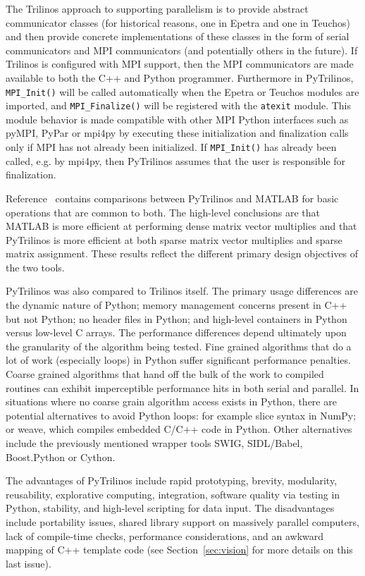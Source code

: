 \documentclass[11pt]{article}
\begin{document}
The Trilinos approach to supporting parallelism is to provide abstract communicator classes (for historical reasons, one in Epetra and one in Teuchos) and then provide concrete implementations of these classes in the form of serial communicators and MPI communicators (and potentially others in the future).  If Trilinos is configured with MPI support, then the MPI communicators are made available to both the C++ and Python programmer.  Furthermore in PyTrilinos, {\tt MPI\_Init()} will be called automatically when the Epetra or Teuchos modules are imported, and {\tt MPI\_Finalize()} will be registered with the {\tt atexit} module.  This module behavior is made compatible with other MPI Python interfaces such as pyMPI, PyPar or mpi4py by executing these initialization and finalization calls only if MPI has not already been initialized.  If {\tt MPI\_Init()} has already been called, e.g. by mpi4py, then PyTrilinos assumes that the user is responsible for finalization.

Reference~\cite{PyTrilinos} contains comparisons between PyTrilinos and MATLAB for basic operations that are common to both.  The high-level conclusions are that MATLAB is more efficient at performing dense matrix vector multiplies and that PyTrilinos is more efficient at both sparse matrix vector multiplies and sparse matrix assignment.  These results reflect the different primary design objectives of the two tools.

PyTrilinos was also compared to Trilinos itself.  The primary usage differences are the dynamic nature of Python; memory management concerns present in C++ but not Python; no header files in Python; and high-level containers in Python versus low-level C arrays.  The performance differences depend ultimately upon the granularity of the algorithm being tested.  Fine grained algorithms that do a lot of work (especially loops) in Python suffer significant performance penalties.  Coarse grained algorithms that hand off the bulk of the work to compiled routines can exhibit imperceptible performance hits in both serial and parallel.  In situations where no coarse grain algorithm access exists in Python, there are potential alternatives to avoid Python loops: for example slice syntax in NumPy; or weave, which compiles embedded C/C++ code in Python.  Other alternatives include the previously mentioned wrapper tools SWIG, SIDL/Babel, Boost.Python or Cython.

The advantages of PyTrilinos include rapid prototyping, brevity, modularity, reusability, explorative computing, integration, software quality via testing in Python, stability, and high-level scripting for data input.  The disadvantages include portability issues, shared library support on massively parallel computers, lack of compile-time checks, performance considerations, and an awkward mapping of C++ template code (see Section~\ref{sec:vision} for more details on this last issue).
\end{document}
